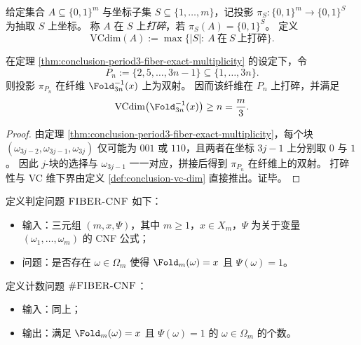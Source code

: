 \begin{definition}[坐标打碎与 VC 维]\label{def:conclusion-vc-dim}
给定集合 \(A\subseteq\{0,1\}^m\) 与坐标子集 \(S\subseteq\{1,\dots,m\}\)，记投影 \(\pi_S:\{0,1\}^m\to\{0,1\}^{S}\) 为抽取 \(S\) 上坐标。
称 \(A\) 在 \(S\) 上\emph{打碎}，若 \(\pi_S(A)=\{0,1\}^{S}\)。
定义
\[
\mathrm{VCdim}(A):=\max\{|S|:\ A\ \text{在}\ S\ \text{上打碎}\}.
\]
\end{definition}

\begin{corollary}\label{cor:conclusion-period3-fiber-hypercube-vc}
在定理 \ref{thm:conclusion-period3-fiber-exact-multiplicity} 的设定下，令
\[
P_n:=\{2,5,\dots,3n-1\}\subseteq\{1,\dots,3n\}.
\]
则投影 \(\pi_{P_n}\) 在纤维 \(\Fold_{3n}^{-1}(x)\) 上为双射。
因而该纤维在 \(P_n\) 上打碎，并满足
\[
\mathrm{VCdim}\bigl(\Fold_{3n}^{-1}(x)\bigr)\ge n=\frac{m}{3}.
\]
\end{corollary}

\begin{proof}
由定理 \ref{thm:conclusion-period3-fiber-exact-multiplicity}，每个块 \((\omega_{3j-2},\omega_{3j-1},\omega_{3j})\) 仅可能为 \(001\) 或 \(110\)，且两者在坐标 \(3j-1\) 上分别取 \(0\) 与 \(1\)。
因此 \(j\)-块的选择与 \(\omega_{3j-1}\) 一一对应，拼接后得到 \(\pi_{P_n}\) 在纤维上的双射。
打碎性与 VC 维下界由定义 \ref{def:conclusion-vc-dim} 直接推出。证毕。
\end{proof}

\begin{definition}[纤维约束可满足性与计数问题]\label{def:conclusion-fiber-cnf}
定义判定问题 \(\textsc{FIBER-CNF}\) 如下：
\begin{itemize}
  \item 输入：三元组 \((m,x,\Psi)\)，其中 \(m\ge 1\)，\(x\in X_m\)，\(\Psi\) 为关于变量 \((\omega_1,\dots,\omega_m)\) 的 CNF 公式；
  \item 问题：是否存在 \(\omega\in\Omega_m\) 使得 \(\Fold_m(\omega)=x\) 且 \(\Psi(\omega)=1\)。
\end{itemize}
定义计数问题 \(\#\textsc{FIBER-CNF}\)：
\begin{itemize}
  \item 输入：同上；
  \item 输出：满足 \(\Fold_m(\omega)=x\) 且 \(\Psi(\omega)=1\) 的 \(\omega\in\Omega_m\) 的个数。
\end{itemize}
\end{definition}

